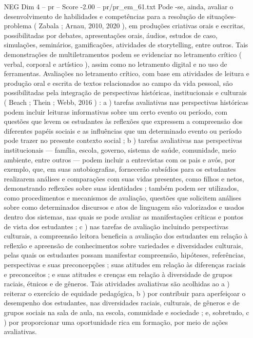 \begin{textsample}{NEG Dim 4 – pr – Score -2.00 – pr/pr\_em\_61.txt}
Pode -se, ainda, avaliar o desenvolvimento de habilidades e competências para a resolução de situações-problema ( Zabala ; Arnau, 2010, 2020 ), em produções criativas orais e escritas, possibilitadas por debates, apresentações orais, áudios, estudos de caso, simulações, seminários, gamificações, atividades de storytelling, entre outros.
Tais demonstrações de multiletramentos podem se evidenciar no letramento crítico ( verbal, corporal e artístico ), assim como no letramento digital e no uso de ferramentas.
Avaliações no letramento crítico, com base em atividades de leitura e produção oral e escrita de textos relacionados ao campo da vida pessoal, são possibilitadas pela integração de perspectivas históricas, institucionais e culturais ( Beach ; Thein ; Webb, 2016 ) : a ) tarefas avaliativas nas perspectivas históricas podem incluir leituras informativas sobre um certo evento ou período, com questões que levem os estudantes às reflexões que expressem a compreensão dos diferentes papéis sociais e as influências que um determinado evento ou período pode trazer no presente contexto social ; b ) tarefas avaliativas nas perspectivas institucionais — família, escola, governo, sistema de saúde, comunidade, meio ambiente, entre outros — podem incluir a entrevistas com os pais e avós, por exemplo, que, em suas autobiografias, fornecerão subsídios para os estudantes realizarem análises e comparações com suas vidas presentes, como filhos e netos, demonstrando reflexões sobre suas identidades ; também podem ser utilizados, como procedimentos e mecanismos de avaliação, questões que solicitem análises sobre como determinados discursos e atos de linguagem são valorizados e usados dentro dos sistemas, nas quais se pode avaliar as manifestações críticas e pontos de vista dos estudantes ; c ) nas tarefas de avaliação incluindo perspectivas culturais, a compreensão leitora beneficia a avaliação dos estudantes em relação à reflexão e apreensão de conhecimentos sobre variedades e diversidades culturais, pelas quais os estudantes possam manifestar compreensão, hipóteses, referências, perspectivas e suas preconcepções ; suas atitudes em relação às diferenças raciais e preconceitos ; e suas atitudes e crenças em relação à diversidade de grupos raciais, étnicos e de gêneros.
Tais atividades avaliativas são acolhidas ao a ) reiterar o exercício de equidade pedagógica, b ) por contribuir para aperfeiçoar o desempenho dos estudantes, nas diversidades raciais, culturais, de gêneros e de grupos sociais na sala de aula, na escola, comunidade e sociedade ; e, sobretudo, c ) por proporcionar uma oportunidade rica em formação, por meio de ações avaliativas.

\end{textsample}
